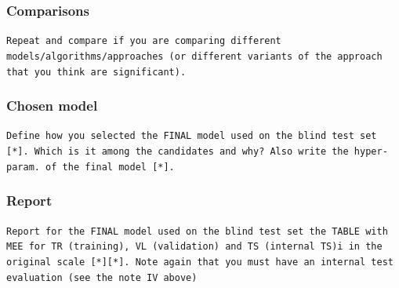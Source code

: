\subsubsection{Comparisons}
\texttt{Repeat and compare if you are comparing different models/algorithms/approaches (or different variants of the approach that you think are significant). }
\subsubsection{Chosen model}
\texttt{Define how you selected the FINAL model used on the blind test set [*]. Which is it among the candidates and why? Also write the  hyper-param. of the final model [*].}
\subsubsection{Report}
\texttt{Report for the FINAL model used on the blind test set the TABLE with MEE for TR (training), VL (validation) and TS (internal TS)i  in the original scale [*][*]. Note again  that you must have an internal  test evaluation (see the note IV above)}
